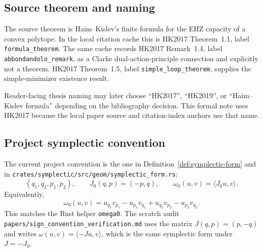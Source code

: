 %
%
%


\subsection{Source theorem and naming}
\label{subsec:hk2017-source-theorem-and-naming}

The source theorem is Haim--Kislev's finite formula for the EHZ capacity of a
convex polytope.  In the local citation cache this is HK2017 Theorem~1.1,
label \texttt{formula\_theorem}.  The same cache records HK2017 Remark~1.4,
label \texttt{abbondandolo\_remark}, as a Clarke dual-action-principle
connection and explicitly not a theorem.  HK2017 Theorem~1.5, label
\texttt{simple\_loop\_theorem}, supplies the simple-minimizer existence result.

Reader-facing thesis naming may later choose ``HK2017'', ``HK2019'', or
``Haim--Kislev formula'' depending on the bibliography decision.  This formal
note uses HK2017 because the local paper source and citation-index anchors use
that name.

\subsection{Project symplectic convention}
\label{subsec:hk2017-project-symplectic-convention}

The current project convention is the one in
Definition~\ref{def:symplectic-form} and in
\texttt{crates/symplectic/src/geom/symplectic\_form.rs}:
\[
  (q_1,q_2,p_1,p_2), \qquad
  J_0(q,p)=(-p,q), \qquad
  \omega_0(u,v)=\langle J_0u,v\rangle.
\]
Equivalently,
\[
  \omega_0(u,v)
  =
  u_{q_1}v_{p_1}-u_{p_1}v_{q_1}
  +u_{q_2}v_{p_2}-u_{p_2}v_{q_2}.
\]
This matches the Rust helper \texttt{omega0}.  The scratch audit
\texttt{papers/sign\_convention\_verification.md} uses the matrix
\(J(q,p)=(p,-q)\) and writes \(\omega(u,v)=\langle -Ju,v\rangle\), which is
the same symplectic form under \(J=-J_0\).


